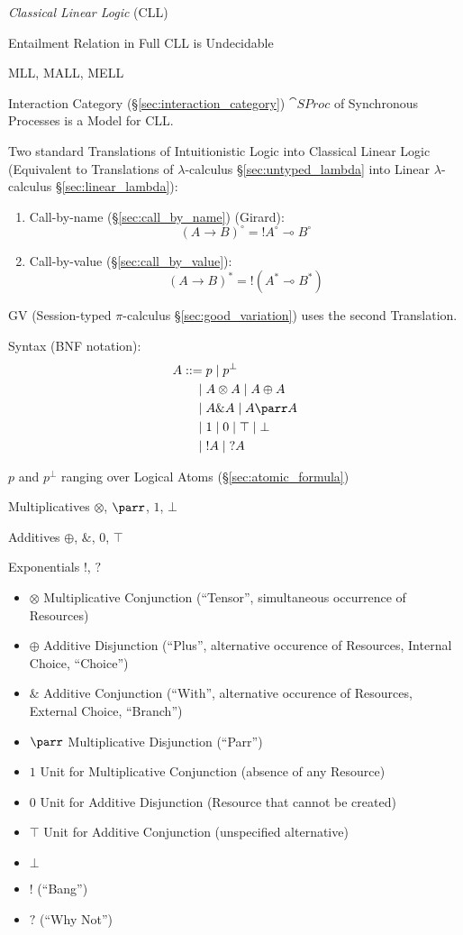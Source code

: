 \emph{Classical Linear Logic} (CLL)

Entailment Relation in Full CLL is Undecidable

MLL, MALL, MELL

Interaction Category (\S\ref{sec:interaction_category}) $\cat{SProc}$
of Synchronous Processes is a Model for CLL.

Two standard Translations of Intuitionistic Logic into Classical
Linear Logic (Equivalent to Translations of $\lambda$-calculus
\S\ref{sec:untyped_lambda} into Linear
$\lambda$-calculus \S\ref{sec:linear_lambda}):\cite{wadler12}
\begin{enumerate}
  \item Call-by-name (\S\ref{sec:call_by_name}) (Girard):
\[
  (A \rightarrow B)^\circ = !A^\circ \multimap B^\circ
\]
  \item Call-by-value (\S\ref{sec:call_by_value}):
\[
  (A \rightarrow B)^* = !(A^* \multimap B^*)
\]
\end{enumerate}
GV (Session-typed $\pi$-calculus \S\ref{sec:good_variation}) uses the
second Translation.

Syntax (BNF notation):
\[
\begin{split}
  A ::=& \; p \; | \; p^\bot\\
      |& \; A \otimes A \; | \; A \oplus A\\
      |& \; A \& A \; | \; A \parr A\\
      |& \; 1 \; | \; 0 \; | \; \top \; | \; \bot\\
      |& \; !A \; | \; ?A
\end{split}
\]

$p$ and $p^\bot$ ranging over Logical Atoms
(\S\ref{sec:atomic_formula})

Multiplicatives $\otimes$, $\parr$, $1$, $\bot$

Additives $\oplus$, $\&$, $0$, $\top$

Exponentials $!$, $?$

\begin{itemize}
  \item $\otimes$ Multiplicative Conjunction (``Tensor'', simultaneous
    occurrence of Resources)
  \item $\oplus$ Additive Disjunction (``Plus'', alternative occurence
    of Resources, Internal Choice, ``Choice'')
  \item $\&$ Additive Conjunction (``With'', alternative occurence of
    Resources, External Choice, ``Branch'')
  \item $\parr$ Multiplicative Disjunction (``Parr'')
  \item $1$ Unit for Multiplicative Conjunction (absence of any
    Resource)
  \item $0$ Unit for Additive Disjunction (Resource that cannot be
    created)
  \item $\top$ Unit for Additive Conjunction (unspecified alternative)
  \item $\bot$
  \item $!$ (``Bang'')
  \item $?$ (``Why Not'')
\end{itemize}

